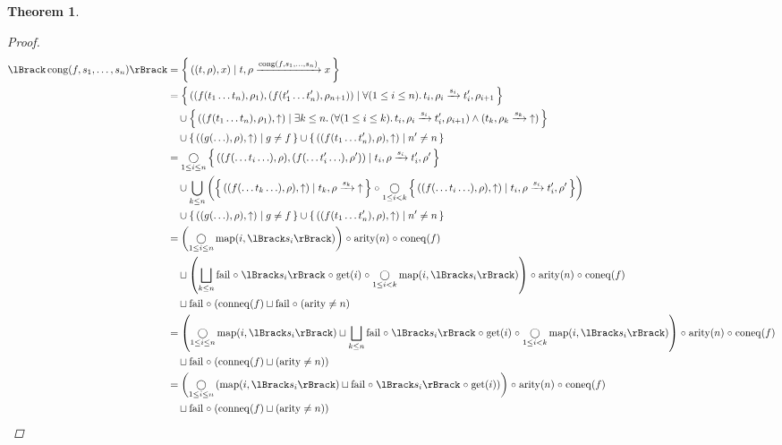 \documentclass{article}
\newtheorem{theorem}{Theorem}
\newcommand{\fail}{\ensuremath \text{$\uparrow$}}
\newcommand{\congr}[1]{\ensuremath \operatorname{cong}(#1)}
\newcommand{\transform}[5]{#1, #2 \xrightarrow{#3} #4, #5}
\newcommand{\transformx}[4]{#1, #2 \xrightarrow{#3} #4}
\newcommand{\transformfail}[3]{#1, #2 \xrightarrow{#3} \fail}
\newcommand{\sem}[1]{\ensuremath \lBrack #1 \rBrack}
\newcommand{\setbuild}[2]{\ensuremath \left\{\, #1 \mid #2 \,\right\}}
\newcommand{\lfail}{\ensuremath \operatorname{fail}}
\newcommand{\get}{\ensuremath \operatorname{get}}
\newcommand{\map}{\ensuremath \operatorname{map}}
\newcommand{\arity}{\ensuremath \operatorname{arity}}
\newcommand{\coneq}{\ensuremath \operatorname{coneq}}
\newcommand{\conneq}{\ensuremath \operatorname{conneq}}
\newcommand{\comp}{\ensuremath \mathrel{\circ}}
\begin{document}
\begin{theorem}
\begin{proof}
\begin{align*}
  \sem{\congr{f,s_1,\ldots,s_n}}
    &= \setbuild{((t,\rho),x)}{\transformx{t}{\rho}{\congr{f,s_1,\ldots,s_n}}{x}} \\
    &= \setbuild{((f(t_1\ldots t_n),\rho_1),(f(t_1'\ldots t_n'),\rho_{n+1}))}{ \forall (1 \leq i \leq n).\, \transform{t_i}{\rho_i}{s_i}{t_i'}{\rho_{i+1}}} \\
    &\quad \cup \setbuild{((f(t_1\ldots t_n),\rho_1),\fail)}{ \exists k \leq n.\, (\forall (1 \leq i \leq k).\, \transform{t_i}{\rho_i}{s_i}{t_i'}{\rho_{i+1}}) \land (\transformfail{t_k}{\rho_k}{s_k})} \\
    &\quad \cup \setbuild{((g(\ldots),\rho),\fail)}{ g \neq f } \cup \setbuild{((f(t_1\ldots t_n'),\rho),\fail)}{ n' \neq n } \\
    &= \mathop{\bigcirc}_{1\leq i \leq n} \setbuild{((f(\ldots t_i \ldots),\rho),(f(\ldots t_i' \ldots),\rho'))}{ \transform{t_i}{\rho}{s_i}{t_i'}{\rho'} } \\
    &\quad \cup \bigcup_{k \leq n} \left( \setbuild{ ((f(\ldots t_k \ldots),\rho),\fail) }{ \transformfail{t_k}{\rho}{s_k} } \comp \mathop{\bigcirc}_{1\leq i < k} \setbuild{((f(\ldots t_i \ldots),\rho),\fail)}{ \transform{t_i}{\rho}{s_i}{t_i'}{\rho'}} \right) \\
    &\quad \cup {\setbuild{((g(\ldots),\rho),\fail)}{ g \neq f }} \cup {\setbuild{((f(t_1\ldots t_n'),\rho),\fail)}{n' \neq n }} \\
    &= \left( \mathop{\bigcirc}_{1\leq i \leq n} \map(i,\sem{s_i}) \right) \comp \arity(n) \comp \coneq(f) \\
    &\quad \sqcup \left( \bigsqcup_{k \leq n} \lfail \comp \sem{s_i} \comp \get(i) \comp \mathop{\bigcirc}_{1 \leq i < k} \map(i,\sem{s_i}) \right) \comp \arity(n) \comp \coneq(f) \\
    &\quad \sqcup \lfail \comp (\conneq(f) \sqcup \lfail \comp (\arity \neq n) \\
    &= \left( \mathop{\bigcirc}_{1\leq i \leq n} \map(i,\sem{s_i}) \sqcup \bigsqcup_{k \leq n} \lfail \comp \sem{s_i} \comp \get(i) \comp \mathop{\bigcirc}_{1 \leq i < k} \map(i,\sem{s_i}) \right) \comp \arity(n) \comp \coneq(f) \\
    &\quad \sqcup \lfail \comp \left(\conneq(f) \sqcup (\arity \neq n) \right) \\
    &= \left( \mathop{\bigcirc}_{1\leq i \leq n} \left( \map(i,\sem{s_i}) \sqcup \lfail \comp \sem{s_i} \comp \get(i) \right) \right) \comp \arity(n) \comp \coneq(f) \\
    &\quad \sqcup \lfail \comp \left(\conneq(f) \sqcup (\arity \neq n) \right)
\end{align*}


\end{proof}
\end{theorem}
\end{document}

